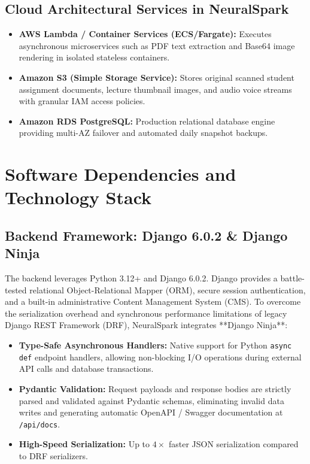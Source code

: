 \subsection{Cloud Architectural Services in NeuralSpark}
\begin{itemize}[leftmargin=*]
    \item \textbf{AWS Lambda / Container Services (ECS/Fargate):} Executes asynchronous microservices such as PDF text extraction and Base64 image rendering in isolated stateless containers.
    \item \textbf{Amazon S3 (Simple Storage Service):} Stores original scanned student assignment documents, lecture thumbnail images, and audio voice streams with granular IAM access policies.
    \item \textbf{Amazon RDS PostgreSQL:} Production relational database engine providing multi-AZ failover and automated daily snapshot backups.
\end{itemize}

\section{Software Dependencies and Technology Stack}

\subsection{Backend Framework: Django 6.0.2 \& Django Ninja}
The backend leverages Python 3.12+ and Django 6.0.2. Django provides a battle-tested relational Object-Relational Mapper (ORM), secure session authentication, and a built-in administrative Content Management System (CMS). To overcome the serialization overhead and synchronous performance limitations of legacy Django REST Framework (DRF), NeuralSpark integrates **Django Ninja**:
\begin{itemize}[leftmargin=*]
    \item \textbf{Type-Safe Asynchronous Handlers:} Native support for Python \texttt{async def} endpoint handlers, allowing non-blocking I/O operations during external API calls and database transactions.
    \item \textbf{Pydantic Validation:} Request payloads and response bodies are strictly parsed and validated against Pydantic schemas, eliminating invalid data writes and generating automatic OpenAPI / Swagger documentation at \texttt{/api/docs}.
    \item \textbf{High-Speed Serialization:} Up to $4\times$ faster JSON serialization compared to DRF serializers.
\end{itemize}

